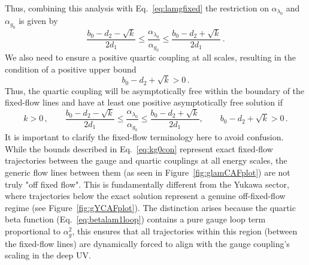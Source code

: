Thus, combining this analysis with Eq.~\eqref{eq:lamgfixed} the restriction on $\alpha_{\lambda_0}$ and $\alpha_{g_0}$ is given by
\begin{equation}
    \frac{b_0-d_2-\sqrt{k}}{2d_1}\le \frac{\alpha_{\lambda_0}}{\alpha_{g_0}}\le \frac{b_0-d_2+\sqrt{k}}{2d_1}\,.
\end{equation}
We also need to ensure a positive quartic coupling at all scales, resulting in the condition of a positive upper bound
\begin{equation}
    {b_0-d_2+\sqrt{k}}>0\,.
\end{equation}
Thus, the quartic coupling will be asymptotically free within the boundary of the fixed-flow lines and have at least one positive asymptotically free solution if
\begin{equation}
    k>0\,,\quad\quad  \frac{b_0-d_2-\sqrt{k}}{2d_1}\le \frac{\alpha_{\lambda_0}}{\alpha_{g_0}}\le \frac{b_0-d_2+\sqrt{k}}{2d_1}, \quad\quad {b_0-d_2+\sqrt{k}}>0\,.\label{eq:kg0con}
\end{equation}
It is important to clarify the fixed-flow terminology here to avoid confusion. While the bounds described in Eq.~\eqref{eq:kg0con} represent exact fixed-flow trajectories between the gauge and quartic couplings at all energy scales, the generic flow lines between them (as seen in Figure~\ref{fig:glamCAFplot}) are not truly "off fixed flow". This is fundamentally different from the Yukawa sector, where trajectories below the exact solution represent a genuine off-fixed-flow regime (see Figure~\ref{fig:gYCAFplot}). The distinction arises because the quartic beta function (Eq.~\eqref{eq:betalam1loop}) contains a pure gauge loop term proportional to $\alpha_g^2$, this ensures that all trajectories within this region (between the fixed-flow lines) are dynamically forced to align with the gauge coupling's scaling in the deep UV.

